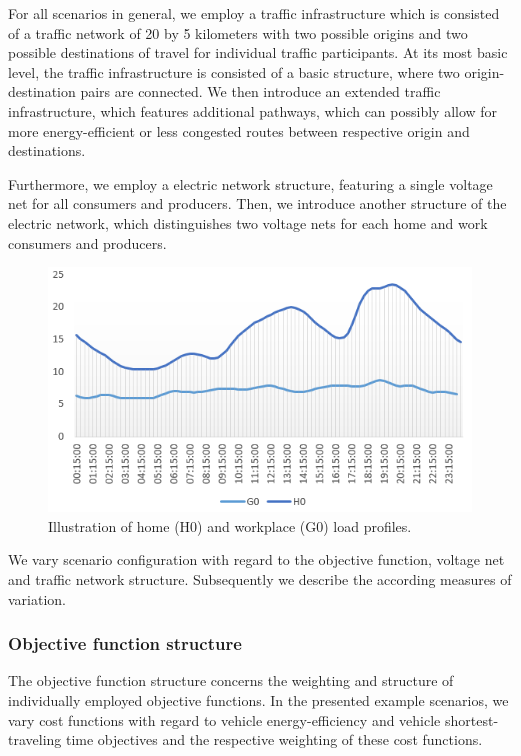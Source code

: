 For all scenarios in general, we employ a traffic infrastructure which is consisted of a traffic network of 20 by 5 kilometers with two possible origins and two possible destinations of travel for individual traffic participants. At its most basic level, the traffic infrastructure is consisted of a basic structure, where two origin-destination pairs are connected. We then introduce an extended traffic infrastructure, which features additional pathways, which can possibly allow for more energy-efficient or less congested routes between respective origin and destinations.

Furthermore, we employ a electric network structure, featuring a single voltage net for all consumers and producers. Then, we introduce another structure of the electric network, which distinguishes two voltage nets for each home and work consumers and producers.

\begin{figure}
	\centering
	\includegraphics[width=\columnwidth]{gfx/profiles.PNG}
	\caption{Illustration of home (H0) and workplace (G0) load profiles.}
	\label{profiles}
\end{figure}

We vary scenario configuration with regard to the objective function, voltage net and traffic network structure. Subsequently we describe the according measures of variation.

\subsubsection{Objective function structure}

The objective function structure concerns the weighting and structure of individually employed objective functions. In the presented example scenarios, we vary cost functions with regard to vehicle energy-efficiency and vehicle shortest-traveling time objectives and the respective weighting of these cost functions. 

